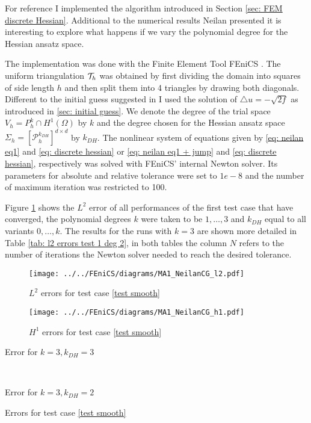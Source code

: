 For reference I implemented the algorithm introduced in Section \ref{sec: FEM discrete Hessian}.
Additional to the numerical results Neilan presented it is interesting to explore what happens if we vary the polynomial degree for the Hessian ansatz space. 

The implementation was done with the Finite Element Tool FEniCS \cite{FEniCS}. The uniform triangulation $\mathcal{T}_h$ was obtained by first dividing the domain into squares of side length $h$ and then split them into 4 triangles by drawing both diagonals. \\
Different to the initial guess suggested in \cite{Neilan2014} I used the solution of $\triangle u = -\sqrt{2f}$ as introduced in \ref{sec: initial guess}. 
We denote the degree of the trial space $V_h=P_h^k \cap H^1(\Omega)$ by $k$ and the degree chosen for the Hessian ansatz space $\Sigma_h = [\mathcal{P}_h^{k_{DH}}]^{d \times d}$ by $k_{DH}$. The nonlinear system of equations given by \eqref{eq: neilan eq1} and \eqref{eq: discrete hessian} or \eqref{eq: neilan eq1 + jump} and \eqref{eq: discrete hessian}, respectively was solved with FEniCS' internal Newton solver. Its parameters for absolute and relative tolerance were set to $1e-8$ and the number of maximum iteration was restricted to 100. 

Figure \ref{fig: l2 errors test 1} shows the $L^2$ error of all performances of the first test case that have converged, the polynomial degrees $k$ were taken to be $1,\dots,3$ and $k_{DH}$ equal to all variants $0, \dots, k$.  The results for the runs with $k=3$ are shown more detailed in Table \ref{tab: l2 errors test 1 deg 2}, in both tables the column $N$ refers to the number of iterations the Newton solver needed to reach the desired tolerance. 



\begin{figure}[h!]
\centering
	\texttt{[image: ../../FEniCS/diagrams/MA1\_NeilanCG\_l2.pdf]}
	\caption{$L^2$ errors for test case \ref{test smooth}}
	\label{fig: l2 errors test 1}
\end{figure}

\begin{figure}[h!]
\centering
	\texttt{[image: ../../FEniCS/diagrams/MA1\_NeilanCG\_h1.pdf]}
	\caption{$H^1$ errors for test case \ref{test smooth}}
	\label{fig: h2 errors test 1}
\end{figure}

\begin{table}[h]
	\begin{subtable}[b]{0.45\textwidth}
		\centering
		\pgfplotstabletypeset[columns={iterations, l2error, h1error,N}]\MAOnedegThreeThree
    	\caption{Error for $k=3, k_{DH}=3$}
   \end{subtable}
   ~
	\begin{subtable}[b]{0.45\textwidth}
		\centering
		\pgfplotstabletypeset[columns={iterations, l2error, h1error,N}]\MAOnedegThreeTwo
 	\caption{Error for $k=3, k_{DH}=2$}
	\end{subtable}
	\caption{Errors for test case \ref{test smooth}}
	\label{tab: l2 errors test 1 deg 2}
\end{table}


